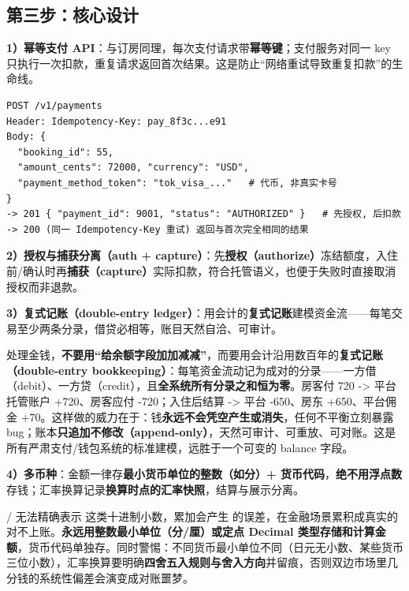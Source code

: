 \subsection{第三步：核心设计}

\textbf{1）幂等支付 API}：与订房同理，每次支付请求带\textbf{幂等键}；支付服务对同一 key 只执行一次扣款，重复请求返回首次结果。这是防止“网络重试导致重复扣款”的生命线。

\begin{lstlisting}
POST /v1/payments
Header: Idempotency-Key: pay_8f3c...e91
Body: {
  "booking_id": 55,
  "amount_cents": 72000, "currency": "USD",
  "payment_method_token": "tok_visa_..."   # 代币, 非真实卡号
}
-> 201 { "payment_id": 9001, "status": "AUTHORIZED" }   # 先授权, 后扣款
-> 200 (同一 Idempotency-Key 重试) 返回与首次完全相同的结果
\end{lstlisting}

\textbf{2）授权与捕获分离（auth + capture）}：先\textbf{授权（authorize）}冻结额度，入住前/确认时再\textbf{捕获（capture）}实际扣款，符合托管语义，也便于失败时直接取消授权而非退款。

\textbf{3）复式记账（double-entry ledger）}：用会计的\textbf{复式记账}建模资金流——每笔交易至少两条分录，借贷必相等，账目天然自洽、可审计。

\begin{idea}
处理金钱，\textbf{不要用“给余额字段加加减减”}，而要用会计沿用数百年的\textbf{复式记账（double-entry bookkeeping）}：每笔资金流动记为成对的分录——一方借（debit）、一方贷（credit），且\textbf{全系统所有分录之和恒为零}。房客付 720 -> 平台托管账户 +720、房客应付 -720；入住后结算 -> 平台 -650、房东 +650、平台佣金 +70。这样做的威力在于：钱\textbf{永远不会凭空产生或消失}，任何不平衡立刻暴露 bug；账本\textbf{只追加不修改（append-only）}，天然可审计、可重放、可对账。这是所有严肃支付/钱包系统的标准建模，远胜于一个可变的 balance 字段。
\end{idea}

\textbf{4）多币种}：金额一律存\textbf{最小货币单位的整数（如分）+ 货币代码}，\textbf{绝不用浮点数}存钱；汇率换算记录\textbf{换算时点的汇率快照}，结算与展示分离。

\begin{pitfall}
/ 无法精确表示  这类十进制小数，累加会产生  的误差，在金融场景累积成真实的对不上账。\textbf{永远用整数最小单位（分/厘）或定点 Decimal 类型存储和计算金额}，货币代码单独存。同时警惕：不同货币最小单位不同（日元无小数、某些货币三位小数），汇率换算要明确\textbf{四舍五入规则与舍入方向}并留痕，否则双边市场里几分钱的系统性偏差会演变成对账噩梦。
\end{pitfall}

